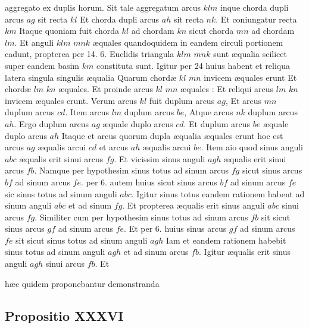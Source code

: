 \documentclass[11pt,a4paper]{article}
\begin{document}
aggregato ex duplis horum. Sit tale aggregatum arcus $klm$ inque chorda dupli arcus $ag$ sit recta $kl$ Et chorda dupli arcus $ah$ sit recta $nk$. Et coniungatur recta $km$ Itaque quoniam fuit chorda $kl$ ad chordam $kn$ sicut chorda $mn$ ad chordam $lm$. Et anguli $klm$ $mnk$ æquales quandoquidem in eandem circuli portionem cadunt, propterea per 14. 6. Euclidis triangula $klm$ $mnk$ sunt æqualia scilicet super eandem basim $km$ constituta sunt. Igitur per 24 huius habent et reliqua latera singula singulis æqualia Quarum chordæ $kl$ $mn$ invicem æquales erunt Et chordæ $lm$ $kn$ æquales. Et proinde arcus $kl$ $mn$ æquales : Et reliqui arcus $lm$ $kn$ invicem æquales erunt. Verum arcus $kl$ fuit duplum arcus $ag$, Et arcus $mn$ duplum arcus $cd$. Item arcus $lm$ duplum arcus $be$, Atque arcus $nk$ duplum arcus $ah$. Ergo duplum arcus $ag$ æquale duplo arcus $cd$. Et duplum arcus $be$ æquale duplo arcus $ah$ Itaque et arcus quorum dupla æqualia æquales erunt hoc est arcus $ag$ æqualis arcui $cd$ et arcus $ah$ æqualis arcui $be$. Item aio quod sinus anguli $abc$ æqualis erit sinui arcus $fg$. Et vicissim sinus anguli $agh$ æqualis erit sinui arcus $fb$. Namque per hypothesim sinus totus ad sinum arcus $fg$ sicut sinus arcus $bf$ ad sinum arcus $fe$. per 6. autem huius sicut sinus arcus $bf$ ad sinum arcus $fe$ sic sinus totus ad sinum anguli $abc$. Igitur sinus totus eandem rationem habent ad sinum anguli $abc$ et ad sinum $fg$. Et propterea æqualis erit sinus anguli $abc$ sinui arcus $fg$. Similiter cum per hypothesim sinus totus ad sinum arcus $fb$ sit sicut sinus  arcus $gf$ ad sinum arcus $fe$. Et per 6. huius sinus arcus $gf$ ad sinum arcus $fe$ sit sicut sinus totus ad sinum anguli $agh$ Iam et eandem rationem habebit sinus totus ad sinum anguli $agh$ et ad sinum arcus $fb$. Igitur æqualis erit sinus anguli $agh$ sinui arcus $fb$. Et

hæc quidem proponebantur demonstranda

\subsection*{Propositio XXXVI}
\end{document}
